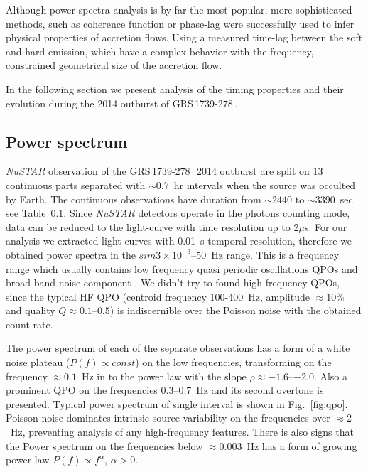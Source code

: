 \documentclass[a4paper,fleqn,usenatbib]{mnras}
\def\grs{{GRS\,1739-278\,}}
\begin{document}
 Although power spectra analysis is by far the most popular, more sophisticated methods, such as coherence function or phase-lag were successfully used to infer physical properties of accretion flows. Using a measured time-lag between the soft and hard emission, which have a complex behavior with the frequency, \cite{1999ApJ...517..355N}  constrained geometrical size of the accretion flow. 


In the following section we present analysis of the timing properties and their evolution during the 2014 outburst of \grs.

\subsection{Power spectrum}
    {\it NuSTAR} observation of the \grs\ 2014 outburst are split on 13 continuous parts separated with $\sim0.7$~hr intervals when the source was occulted by Earth. 
    The continuous observations have duration from $\sim2440$ to $\sim3390$~sec see Table~\ref{}.
    Since {\it NuSTAR} detectors operate in the photons counting mode, data can be reduced to the light-curve with time resolution up to 2$\mu$s.
    For our analysis we extracted light-curves with 0.01~s temporal resolution, therefore we obtained power spectra in the $sim3\times10^{-3}$--$50$~Hz range.
    This is a frequency range which usually contains low frequency quasi periodic oscillations QPOs and broad band noise component \citep{1999ApJ...514..939W}.
    We didn't try to found high frequency QPOs, since the typical HF QPO (centroid frequency 100-400~Hz, amplitude $\approx10$\% and quality $Q\approx0.1$--$0.5$) is indiscernible over the Poisson noise with the obtained count-rate.

    The power spectrum of each of the separate observations has a form of a white noise plateau ($P(f)\propto const$) on the low frequencies, transforming on the frequency $\approx0.1$~Hz in to the power law with the slope $\rho\approx-1.6$--$-2.0$. Also a prominent QPO on the frequencies 0.3--0.7~Hz and its second overtone is presented. Typical power spectrum of single interval is shown in Fig.~\ref{fig:qpo}.
    Poisson noise dominates intrinsic source variability on the frequencies over $\approx2$~Hz, preventing analysis of any high-frequency features. %
    There is also signs that the Power spectrum on the frequencies below $\approx0.003$~Hz has a form of growing power law $P(f)\propto f^{\alpha}$, $\alpha > 0$.
\end{document}
